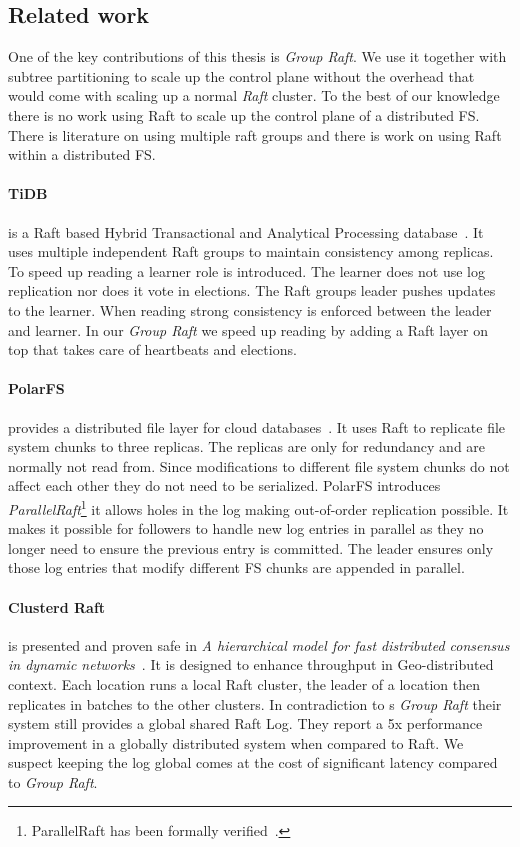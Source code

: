 \subsection{Related work} \label{sec:rel}
One of the key contributions of this thesis is \textit{Group Raft}. We use it together with subtree partitioning to scale up the control plane without the overhead that would come with scaling up a normal \textit{Raft} cluster. To the best of our knowledge there is no work using Raft to scale up the control plane of a distributed FS. There is literature on using multiple raft groups and there is work on using Raft within a distributed FS.
%
%
\paragraph{TiDB} is a Raft based Hybrid Transactional and Analytical Processing database~\cite{tidb}. It uses multiple independent Raft groups to maintain consistency among replicas. To speed up reading a learner role is introduced. The learner does not use log replication nor does it vote in elections. The Raft groups leader pushes updates to the learner. When reading strong consistency is enforced between the leader and learner. In our \textit{Group Raft} we speed up reading by adding a Raft layer on top that takes care of heartbeats and elections.
%
\paragraph{PolarFS} provides a distributed file layer for cloud databases~\cite{polarfs}. It uses Raft to replicate file system chunks to three replicas. The replicas are only for redundancy and are normally not read from. Since modifications to different file system chunks do not affect each other they do not need to be serialized. PolarFS introduces \textit{ParallelRaft}\footnote{ParallelRaft has been formally verified~\cite{verify}.} it allows holes in the log making out-of-order replication possible. It makes it possible for followers to handle new log entries in parallel as they no longer need to ensure the previous entry is committed. The leader ensures only those log entries that modify different FS chunks are appended in parallel.
%
\paragraph{Clusterd Raft} is presented and proven safe in \textit{A hierarchical model for fast distributed consensus in dynamic networks}~\cite{craft}. It is designed to enhance throughput in Geo-distributed context. Each location runs a local Raft cluster, the leader of a location then replicates in batches to the other clusters. In contradiction to \name{}s \textit{Group Raft} their system still provides a global shared Raft Log. They report a 5x performance improvement in a globally distributed system when compared to Raft. We suspect keeping the log global comes at the cost of significant latency compared to \textit{Group Raft}.
